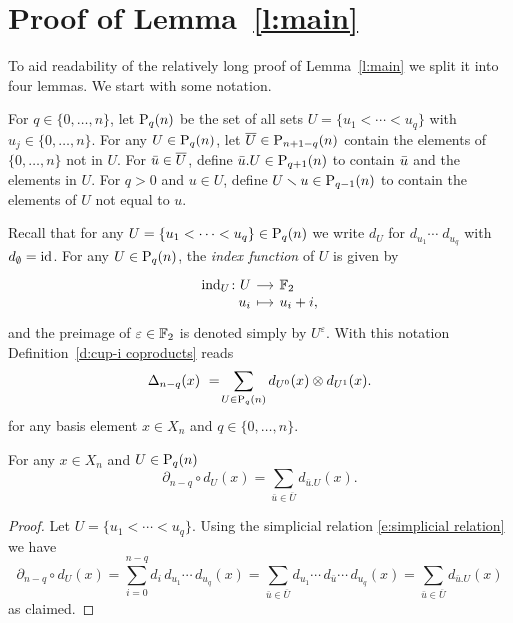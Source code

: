 
\section{Proof of Lemma~\ref{l:main}} \label{s:proof}

To aid readability of the relatively long proof of Lemma~\ref{l:main} we split it into four lemmas.
We start with some notation.

\begin{definition}
	For $q \in \{0, \dots, n\}$, let $\P_q(n)$ be the set of all sets $U = \{u_1 < \cdots < u_q\}$ with $u_j \in \{0, \dots, n\}$.
	For any $U \in \P_q(n)$, let $\overline{U} \in \P_{n+1-q}(n)$ contain the elements of $\{0, \dots, n\}$ not in $U$. For $\bu \in \overline{U}$, define $\bu.U \in \P_{q+1}(n)$ to contain $\bu$ and the elements in $U$.
	For $q > 0$ and $u \in U$, define $U \sm u \in \P_{q-1}(n)$ to contain the elements of $U$ not equal to $u$.
\end{definition}

Recall that for any $U = \{u_1 < \cdots < u_q\} \in \P_q(n)$ we write $d_U$ for $d_{u_1} \cdots \; d_{u_q}$ with $d_{\emptyset} = \id$.
For any $U \in \P_q(n)$, the \textit{index function} of $U$ is given by
\begin{equation*}
\begin{tikzcd}[row sep=-3pt, column sep=small,
/tikz/column 1/.append style={anchor=base east},
/tikz/column 2/.append style={anchor=base west}]
\ind_U \colon U \arrow[r] & \F_2 \\
u_i \arrow[r, mapsto] & u_i + i,
\end{tikzcd}
\end{equation*}
and the preimage of $\varepsilon \in \F_2$ is denoted simply by $U^\varepsilon$.
With this notation Definition~\ref{d:cup-i coproducts} reads
\begin{equation*}
\Delta_{n-q}(x)\ =\! \sum_{U \in \P_q(n)} d_{U^0}(x) \otimes d_{U^1}(x).
\end{equation*}
for any basis element $x \in X_n$ and $q \in \{0, \dots, n\}$.

\begin{lemma} \label{l:partial dU = dxU}
	For any $x \in X_n$ and $U \in \P_{q}(n)$
	\begin{equation} \label{lemma1: existence:eq1}
	\partial_{n-q} \circ d_U(x) = \sum_{\bar{u} \in \overline{U}} d_{\bar{u}.U}(x).
	\end{equation}
\end{lemma}

\begin{proof}
	Let $U = \{u_1 < \cdots < u_q\}$. Using the simplicial relation \eqref{e:simplicial relation} we have
	\begin{equation*}
	\partial_{n-q} \circ d_U(x) = 
	\sum_{i=0}^{n-q} d_i\, d_{u_1} \cdots\, d_{u_q}(x) = 
	\sum_{\bar{u} \in \overline{U}} d_{u_1} \cdots\, d_{\bar{u}} \cdots\, d_{u_q}(x) =
	\sum_{\bar{u} \in \overline{U}} d_{\bar{u}.U}(x)
	\end{equation*}
	as claimed.
\end{proof}

